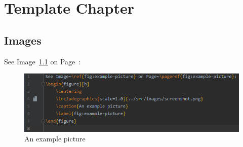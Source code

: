 



\chapter{Template Chapter}\label{ch:template-chapter}
\section{Images}\label{sec:images}
See Image~\ref{fig:example-picture} on Page~\pageref{fig:example-picture}:
\begin{figure}[hbt!]
    \centering
    \includegraphics[scale=1.0]{../src/images/screenshot.png}
    \caption{An example picture}
    \label{fig:example-picture}
\end{figure}

